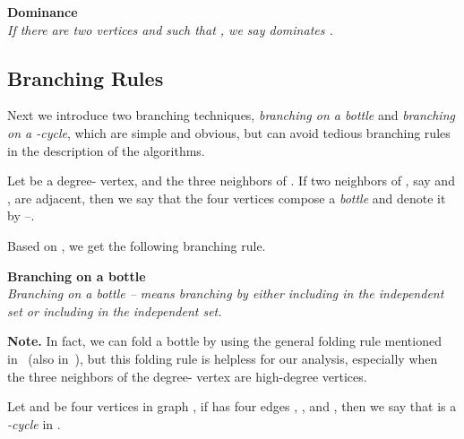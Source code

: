 \documentclass[runningheads]{llncs}
\begin{document}
\vspace{2mm}\noindent \textbf{Dominance}\\
\emph{If there are two vertices  and  such that
, we say  dominates .} 


\subsection{Branching Rules}

Next we introduce two branching techniques, \emph{branching on a
bottle} and \emph{branching on a -cycle}, which are simple and
obvious, but can  avoid tedious branching rules in the description
of the algorithms.

Let  be a degree- vertex, and  the three neighbors of
. If two neighbors of , say  and , are adjacent, then
we say that the four vertices compose a \emph{bottle} and denote
it by --.

 

Based on , we get the following branching rule.

\vspace{2mm}\noindent \textbf{Branching on a bottle}\\
\emph{Branching on a bottle -- means branching by
either including  in the independent set or including  in
the independent set.}

\noindent\textbf{Note. }In fact, we can fold a bottle by using the
general folding rule mentioned in~\cite{Fomin:is} (also
in~\cite{Beigel:is}), but this folding rule is helpless for our
analysis, especially when the three neighbors of the degree-
vertex are high-degree vertices.

\vspace{2mm}Let  and  be four vertices in graph , if
 has four edges , ,  and , then we say that
 is a \emph{-cycle} in .
\end{document}
